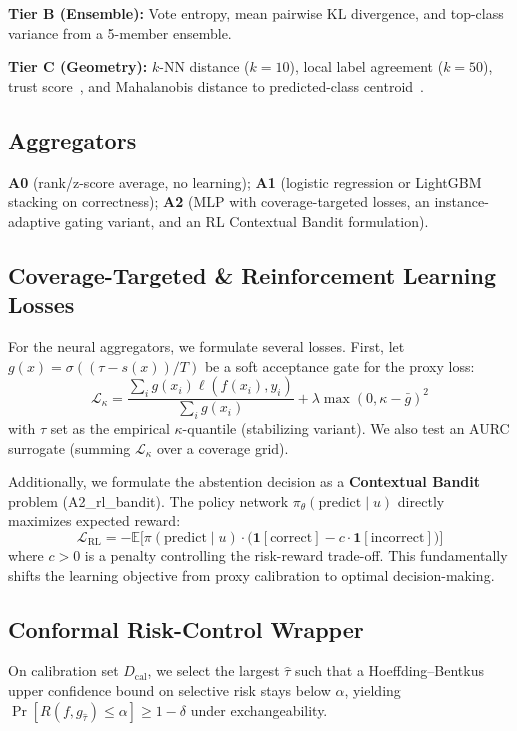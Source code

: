 \documentclass[conference]{IEEEtran}
\begin{document}
\textbf{Tier B (Ensemble):} Vote entropy, mean pairwise KL divergence, and top-class variance from a 5-member ensemble.

\textbf{Tier C (Geometry):} $k$-NN distance ($k{=}10$), local label agreement ($k{=}50$), trust score~\cite{jiang2018trustscore}, and Mahalanobis distance to predicted-class centroid~\cite{lee2018mahalanobis}.

\subsection{Aggregators}
\textbf{A0} (rank/z-score average, no learning); \textbf{A1} (logistic regression or LightGBM stacking on correctness); \textbf{A2} (MLP with coverage-targeted losses, an instance-adaptive gating variant, and an RL Contextual Bandit formulation).

\subsection{Coverage-Targeted \& Reinforcement Learning Losses}
For the neural aggregators, we formulate several losses. First, let $g(x) = \sigma((\tau - s(x))/T)$ be a soft acceptance gate for the proxy loss:
\begin{equation}
  \mathcal{L}_\kappa = \frac{\sum_i g(x_i)\ell(f(x_i),y_i)}{\sum_i g(x_i)} + \lambda\max(0, \kappa - \bar{g})^2
\end{equation}
with $\tau$ set as the empirical $\kappa$-quantile (stabilizing variant). We also test an AURC surrogate (summing $\mathcal{L}_\kappa$ over a coverage grid).

Additionally, we formulate the abstention decision as a \textbf{Contextual Bandit} problem (A2\_rl\_bandit). The policy network $\pi_\theta(\text{predict} \mid u)$ directly maximizes expected reward:
\begin{equation}
  \mathcal{L}_{\mathrm{RL}} = - \mathbb{E}\Big[ \pi(\text{predict} \mid u) \cdot \big( \mathbf{1}[\text{correct}] - c \cdot \mathbf{1}[\text{incorrect}] \big) \Big]
\end{equation}
where $c > 0$ is a penalty controlling the risk-reward trade-off. This fundamentally shifts the learning objective from proxy calibration to optimal decision-making.

\subsection{Conformal Risk-Control Wrapper}
On calibration set $D_{\mathrm{cal}}$, we select the largest $\hat\tau$ such that a Hoeffding--Bentkus upper confidence bound on selective risk stays below $\alpha$, yielding $\Pr[R(f, g_{\hat\tau}) \le \alpha] \ge 1-\delta$ under exchangeability.
\end{document}

